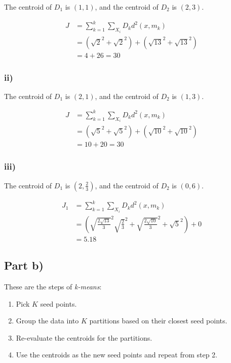 \documentclass{article}
\begin{document}
The centroid of $D_1$ is $(1,1)$, and the centroid of $D_2$ is $(2,3)$.

\begin{align*}
  J   &= \sum\limits_{k=1}^k\sum\limits_{X_i}{D_k}d^2(x,m_k)\\
      &= \left(\sqrt{2}^2 + \sqrt{2}^2\right) + \left(\sqrt{13}^2 + \sqrt{13}^2\right)\\
      &= 4 + 26 = 30
\end{align*}

\subsubsection*{ii)}

The centroid of $D_1$ is $(2,1)$, and the centroid of $D_2$ is $(1,3)$.

\begin{align*}
  J   &= \sum\limits_{k=1}^k\sum\limits_{X_i}{D_k}d^2(x,m_k)\\
      &= \left(\sqrt{5}^2 + \sqrt{5}^2\right) + \left(\sqrt{10}^2 + \sqrt{10}^2\right)\\
      &= 10 + 20 = 30
\end{align*}

\subsubsection*{iii)}

The centroid of $D_1$ is $(2,\frac{2}{3})$, and the centroid of $D_2$ is $(0,6)$.

\begin{align*}
  J_1 &= \sum\limits_{k=1}^k\sum\limits_{X_i}{D_k}d^2(x,m_k)\\
      &= \left(\sqrt{\frac{2\sqrt{13}}{3}}^2 \sqrt{\frac{2}{3}}^2 + \sqrt{\frac{2\sqrt{10}}{3}}^2 + \sqrt{5}^2\right) + 0\\
      &= 5.18
\end{align*}

\subsection*{Part b)}

These are the steps of \textit{k-means}:

\begin{enumerate}
  \item Pick $K$ seed points.
  \item Group the data into $K$ partitions based on their closest seed points.
  \item Re-evaluate the centroids for the partitions.
  \item Use the centroids as the new seed points and repeat from step 2.
\end{enumerate}
\end{document}

